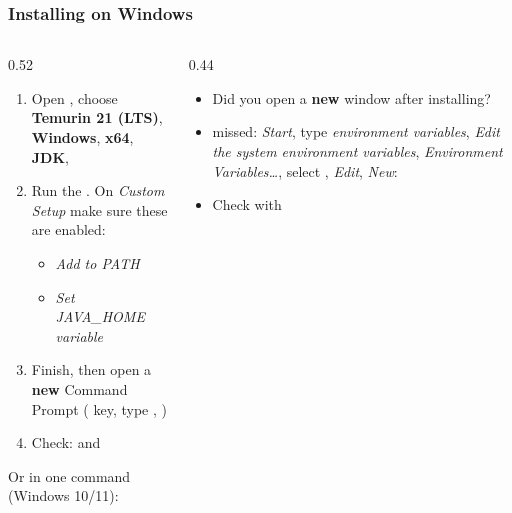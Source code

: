 \documentclass[aspectratio=169,10pt,compress]{beamer}
\begin{document}
\begin{frame}[t,fragile] \frametitle{Installing on Windows}
  \begin{columns}[T]
    \begin{column}{0.52\textwidth}
      \begin{enumerate}\small
        \item Open , choose \textbf{Temurin 21 (LTS)}, \textbf{Windows}, \textbf{x64}, \textbf{JDK}, 
        \item Run the . On \emph{Custom Setup} make sure these are enabled:
          \begin{itemize}\footnotesize
            \item \emph{Add to PATH}
            \item \emph{Set JAVA\_HOME variable}
          \end{itemize}
        \item Finish, then open a \textbf{new} Command Prompt ( key, type , )
        \item Check:  and 
      \end{enumerate}
      \footnotesize Or in one command (Windows 10/11): 
      
    \end{column}
    \begin{column}{0.44\textwidth}
      
      \begin{alertblock}{}
        \footnotesize
        \begin{itemize}
          \item Did you open a \textbf{new} window after installing?
          \item {} missed: \emph{Start}, type \emph{environment variables}, \emph{Edit the system environment variables},
                \emph{Environment Variables\dots}, select , \emph{Edit}, \emph{New}:\\
          \item Check with 
        \end{itemize}
      \end{alertblock}
    
    \end{column}
  \end{columns}
\end{frame}
\end{document}
